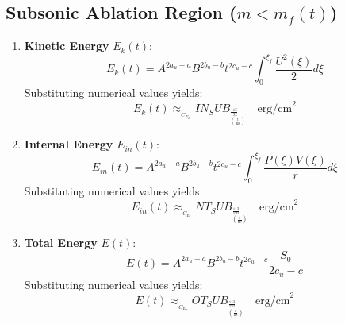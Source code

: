 \documentclass[11pt]{article}
\begin{document}
\subsection{Subsonic Ablation Region ($m < m_f(t)$)}
\begin{enumerate}
    \item \textbf{Kinetic Energy} $E_k(t)$:
    \begin{equation}
        E_k(t) = A^{2a_u - a} B^{2b_u - b} t^{2c_u - c} \int_0^{\xi_f} \frac{U^2(\xi)}{2} d\xi
    \end{equation}
    Substituting numerical values yields:
    \begin{equation}
        E_k(t) \approx __C_E_KIN_SUB__ \left(\frac{t}{\text{ns}}\right)^{\frac{113}{192}} \quad \text{erg/cm}^2
    \end{equation}

    \item \textbf{Internal Energy} $E_{in}(t)$:
    \begin{equation}
        E_{in}(t) = A^{2a_u - a} B^{2b_u - b} t^{2c_u - c} \int_0^{\xi_f} \frac{P(\xi)V(\xi)}{r} d\xi
    \end{equation}
    Substituting numerical values yields:
    \begin{equation}
        E_{in}(t) \approx __C_E_INT_SUB__ \left(\frac{t}{\text{ns}}\right)^{\frac{113}{192}} \quad \text{erg/cm}^2
    \end{equation}

    \item \textbf{Total Energy} $E(t)$:
    \begin{equation}
        E(t) = A^{2a_u - a} B^{2b_u - b} t^{2c_u - c} \frac{S_0}{2c_u - c}
    \end{equation}
    Substituting numerical values yields:
    \begin{equation}
        E(t) \approx __C_E_TOT_SUB__ \left(\frac{t}{\text{ns}}\right)^{\frac{113}{192}} \quad \text{erg/cm}^2
    \end{equation}
\end{enumerate}
\end{document}
